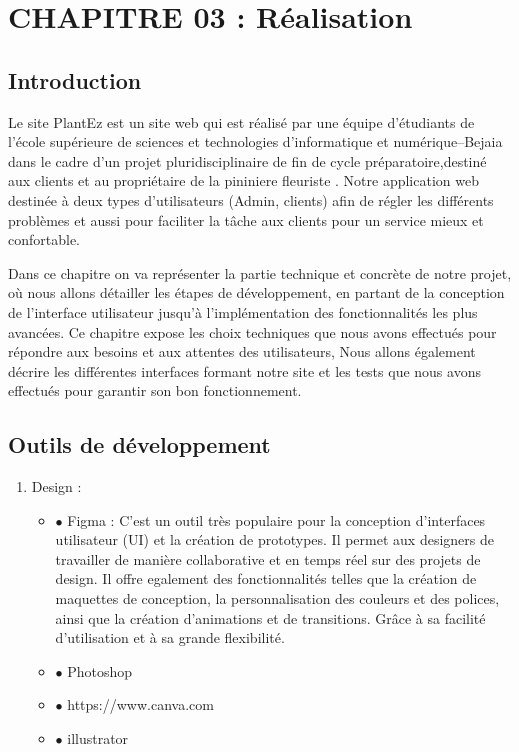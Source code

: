 \documentclass[a4paper,12pt,oneside]{article}
\begin{document}
\newpage
\section{CHAPITRE 03 : Réalisation}
{\fontsize{15}{20}\selectfont 
\subsection{Introduction}

\hspace{1cm} Le site PlantEz est un site web qui est réalisé par une équipe d’étudiants de l’école supérieure de
sciences et technologies d’informatique et numérique–Bejaia dans le cadre d’un projet
pluridisciplinaire de fin de cycle préparatoire,destiné aux clients et au propriétaire de la pininiere
fleuriste . Notre application web destinée à deux types d’utilisateurs (Admin, clients) afin de régler
les différents problèmes et aussi pour faciliter la tâche aux clients pour un service mieux et
confortable.

Dans ce chapitre on va représenter la partie technique et concrète de notre projet, où nous
allons détailler les étapes de développement, en partant de la conception de l’interface utilisateur
jusqu’à l’implémentation des fonctionnalités les plus avancées. Ce chapitre expose les choix
techniques que nous avons effectués pour répondre aux besoins et aux attentes des utilisateurs,
Nous allons également décrire les différentes interfaces formant notre site et les tests que nous
avons effectués pour garantir son bon fonctionnement.

\subsection{Outils de développement}
{\fontsize{15}{20}\selectfont
\begin{enumerate}
  	\item Design :
  		\begin{itemize}
        \item[] $\bullet$ Figma : 
        C'est un outil très populaire pour la conception d’interfaces utilisateur (UI) et
la création de prototypes. Il permet aux designers de travailler de manière collaborative
et en temps réel sur des projets de design. Il offre egalement des fonctionnalités telles que
la création de maquettes de conception, la personnalisation des couleurs et des polices,
ainsi que la création d’animations et de transitions. Grâce à sa facilité d’utilisation et à
sa grande flexibilité.
    		\item[] $\bullet$ Photoshop
    		\item[] $\bullet$ https://www.canva.com
    		\item[] $\bullet$ illustrator
    		    

\end{itemize}
\end{enumerate}}}
\end{document}
